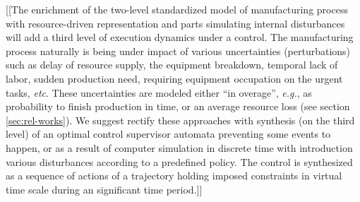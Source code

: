 \documentclass[runningheads]{llncs}
\begin{document}
[[The enrichment of the two-level standardized model of manufacturing process with resource-driven representation and parts simulating internal disturbances will add a third level of execution dynamics under a control.  The manufacturing process naturally is being under impact of various uncertainties (perturbations) such as delay of resource supply, the equipment breakdown, temporal lack of labor, sudden production need, requiring equipment occupation on the urgent tasks, \emph{etc}. These uncertainties are modeled either “in overage”, \emph{e.g.}, as probability to finish production in time, or an average resource loss (see section \ref{sec:rel-works}).  We suggest rectify these approaches with synthesis (on the third level) of an optimal control supervisor automata preventing some events to happen, or as a result of computer simulation in discrete time with introduction various disturbances according to a predefined policy. The control is synthesized as a sequence of actions of a trajectory holding imposed constraints in virtual time scale during an significant time period.]]
\end{document}
